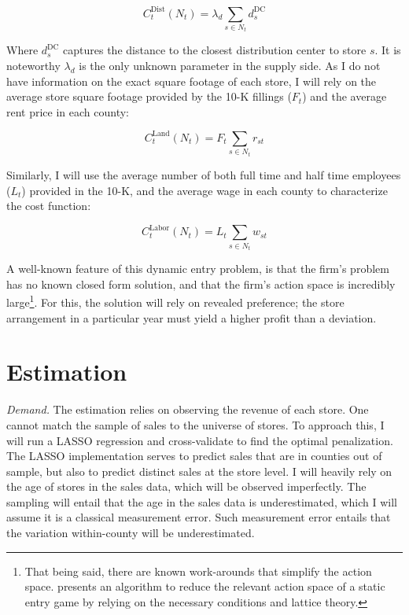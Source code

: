 \documentclass[11.5pt]{article}
\begin{document}
 \[C_t^{\text{Dist}}(N_t) = \lambda_d \sum_{s \in N_t}  d^\text{DC}_{s}\]
 
 Where $d_{s}^\text{DC}$ captures the distance to the closest distribution center to store $s$. It is noteworthy $\lambda_d$  is the only unknown parameter in the supply side. As I do not have information on the exact square footage of each store, I will rely on the average store square footage provided by the 10-K fillings ($F_t$) and the average rent price in each county:

 \[C_t^{\text{Land}}(N_t) =   F_t \sum_{s \in N_t}  r_{st}\]

 Similarly, I will use the average number of both full time and half time employees ($L_t$) provided in the 10-K, and the average wage in each county to characterize the cost function:

\[C_t^{\text{Labor}}(N_t) = L_t \sum_{s \in N_t}  w_{st}\]



 A well-known feature of this dynamic entry problem, is that the firm's problem has no known closed form solution, and that the firm's action space is incredibly large\footnote{That being said, there are known work-arounds that simplify the action space. \citeauthor{jia2008happens} \citeyear{jia2008happens} presents an algorithm to reduce the relevant action space of a static entry game by relying on the necessary conditions and lattice theory.}. For this, the solution will rely on revealed preference; the store arrangement in a particular year must yield a higher profit than a deviation.
 

 
 
 
\section{Estimation}


\textit{Demand.} The estimation relies on observing the revenue of each store. One cannot match the sample of sales to the universe of stores. To approach this, I will run a LASSO regression and cross-validate to find the optimal penalization. The LASSO implementation serves to predict sales that are in counties out of sample, but also to predict distinct sales at the store level. I will heavily rely on the age of stores in the sales data, which will be observed imperfectly. The sampling will entail that the age in the sales data is underestimated, which I will assume it is a classical measurement error. Such measurement error entails that the variation within-county will be underestimated. 
\end{document}
